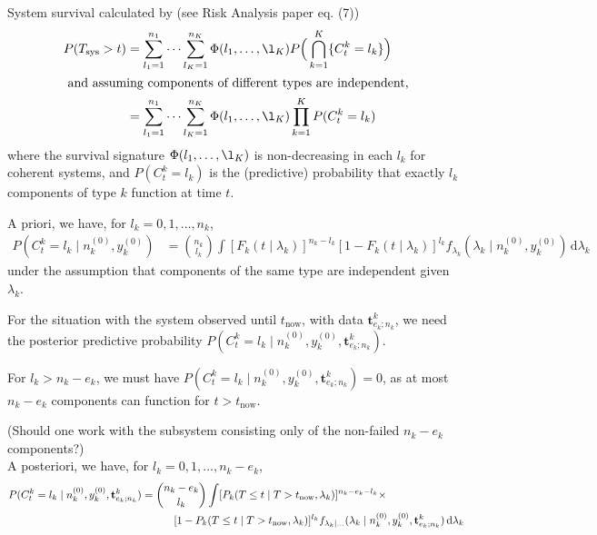 \documentclass[12pt,a4paper,fleqn]{narms}
\newcommand{\dd}{\,\mathrm{d}}
\newcommand{\mbf}[1]{\mathbf{#1}}
\newcommand{\uz}{^{(0)}} %
\def\Tsys{T_\text{sys}}
\def\ykz{y\uz_k}
\def\nkz{n\uz_k}
\def\tnow{t_\text{now}}
\begin{document}
\newpage

System survival calculated by (see Risk Analysis paper eq. (7))
\begin{align}
P(\Tsys > t) &= \sum_{l_1=1}^{n_1} \cdots \sum_{l_K=1}^{n_K} \Phi(l_1,\ldots,\l_K) P\Big( \bigcap_{k=1}^K \{ C^k_t = l_k\} \Big) \\
\intertext{ and assuming components of different types are independent,}
             &= \sum_{l_1=1}^{n_1} \cdots \sum_{l_K=1}^{n_K} \Phi(l_1,\ldots,\l_K) \prod_{k=1}^K P(C^k_t = l_k)
\end{align}
where the survival signature $\Phi(l_1,\ldots,\l_K)$ is non-decreasing in each $l_k$ for coherent systems,
and $P(C^k_t = l_k)$ is the (predictive) probability that exactly $l_k$ components of type $k$ function at time $t$.

A priori, we have, for $l_k = 0,1,\ldots, n_k$,
\begin{align}
P(C^k_t = l_k\mid\nkz,\ykz)
 &= { n_k \choose l_k} \int [F_k(t \mid\lambda_k)]^{n_k-l_k}
                        [1 - F_k(t \mid\lambda_k)]^{l_k} f_{\lambda_k}(\lambda_k\mid\nkz,\ykz) \dd \lambda_k
\end{align}
under the assumption that components of the same type are independent given $\lambda_k$.

\bigskip

For the situation with the system observed until $\tnow$, with data $\mbf{t}^k_{e_k;n_k}$,
we need the posterior predictive probability $P(C^k_t = l_k\mid\nkz,\ykz, \mbf{t}^k_{e_k;n_k})$.

For $l_k > n_k - e_k$, we must have $P(C^k_t = l_k\mid\nkz,\ykz, \mbf{t}^k_{e_k;n_k}) = 0$,
as at most $n_k - e_k$ components can function for $t > \tnow$.

(Should one work with the subsystem consisting only of the non-failed $n_k - e_k$ components?)\\

A posteriori, we have, for $l_k = 0,1,\ldots, n_k - e_k$,
\begin{align}
P(C^k_t = l_k\mid\nkz,\ykz, \mbf{t}^k_{e_k;n_k})
 &= { n_k - e_k \choose l_k} \int [P_k(T \leq t \mid T > \tnow, \lambda_k)]^{n_k - e_k - l_k} \times \\ & \hspace*{7ex}
                              [1 - P_k(T \leq t \mid T > \tnow, \lambda_k)]^{l_k}
    f_{\lambda_k\mid\ldots}(\lambda_k\mid\nkz,\ykz,\mbf{t}^k_{e_k;n_k}) \dd \lambda_k
\end{align}
\end{document}
